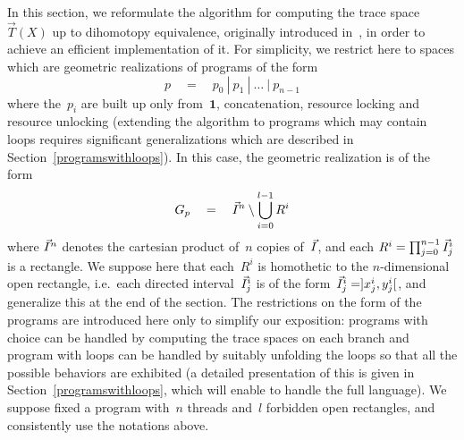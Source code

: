 \documentclass[orivec]{llncs} \usepackage[T1]{fontenc}
\newcommand{\nbd}{\nobreakdash-\hspace{0pt}}
\newcommand{\ie}{i.e.~}
\newcommand{\pone}{\mathbf{1}}
\newcommand{\qeq}{\quad=\quad}
\newcommand{\tspace}[1]{\vec T(#1)}
\begin{document}
In this section, we reformulate the algorithm for computing the trace
space~\hbox{$\tspace X$} up to dihomotopy equivalence, originally introduced
in~\cite{raussen2010simplicial}, in order to achieve an efficient implementation
of it. For simplicity, we restrict here to spaces which are geometric
realizations of programs of the form
\begin{equation}
  \label{eq:prog}
  p
  \qeq
  p_0\ |\ p_1\ |\ \ldots\ |\ p_{n-1}
\end{equation}
where the~$p_i$ are built up only from~$\pone$, concatenation, resource locking
and resource unlocking (extending the algorithm to programs which may contain
loops requires significant generalizations which are described in
Section~\ref{programswithloops}). In this case, the geometric realization is of
the form
\vspace{-2ex}
\[
G_p
\qeq
\dui^n\setminus\bigcup_{i=0}^{l-1}R^i
\]
where $\vec{I}^n$ denotes the cartesian product of~$n$ copies of~$\vec{I}$, and each
\hbox{$R^i=\prod_{j=0}^{n-1}\vec{I}^i_j$} is a rectangle. We suppose here that
each~$R^i$ is homothetic to the $n$\nbd{}dimensional open rectangle, \ie each
directed interval~$\vec{I}^i_j$ is of the form~$\vec{I}^i_j=]x^i_j,y^i_j[$, and
generalize this at the end of the section. The restrictions on the form of the
programs are introduced here only to simplify our exposition: programs with
choice can be handled by computing the trace spaces on each branch and program
with loops can be handled by suitably unfolding the loops so that all the
possible behaviors are exhibited (a detailed presentation of this is given in
Section~\ref{programswithloops}, which will enable to handle the full
language). We suppose fixed a program with~$n$ threads and~$l$ forbidden open
rectangles, and consistently use the notations above.
\end{document}
